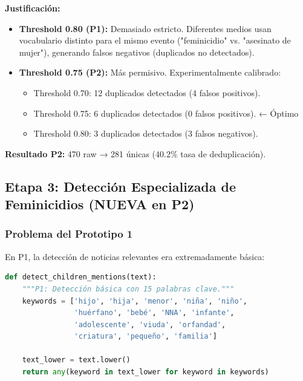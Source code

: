 \textbf{Justificación:} 
\begin{itemize}
    \item \textbf{Threshold 0.80 (P1):} Demasiado estricto. Diferentes medios usan vocabulario distinto para el mismo evento ("feminicidio" vs. "asesinato de mujer"), generando falsos negativos (duplicados no detectados).
    
    \item \textbf{Threshold 0.75 (P2):} Más permisivo. Experimentalmente calibrado:
    \begin{itemize}
        \item Threshold 0.70: 12 duplicados detectados (4 falsos positivos).
        \item Threshold 0.75: 6 duplicados detectados (0 falsos positivos). ← Óptimo
        \item Threshold 0.80: 3 duplicados detectados (3 falsos negativos).
    \end{itemize}
\end{itemize}

\textbf{Resultado P2:} 470 raw → 281 únicas (40.2\% tasa de deduplicación).

\subsection{Etapa 3: Detección Especializada de Feminicidios (NUEVA en P2)}
\label{subsec:impl_detector}

\subsubsection{Problema del Prototipo 1}

En P1, la detección de noticias relevantes era extremadamente básica:

\begin{lstlisting}[language=Python, caption={Detector rudimentario del P1}]
def detect_children_mentions(text):
    """P1: Detección básica con 15 palabras clave."""
    keywords = ['hijo', 'hija', 'menor', 'niña', 'niño', 
                'huérfano', 'bebé', 'NNA', 'infante', 
                'adolescente', 'viuda', 'orfandad', 
                'criatura', 'pequeño', 'familia']
    
    text_lower = text.lower()
    return any(keyword in text_lower for keyword in keywords)
\end{lstlisting}

